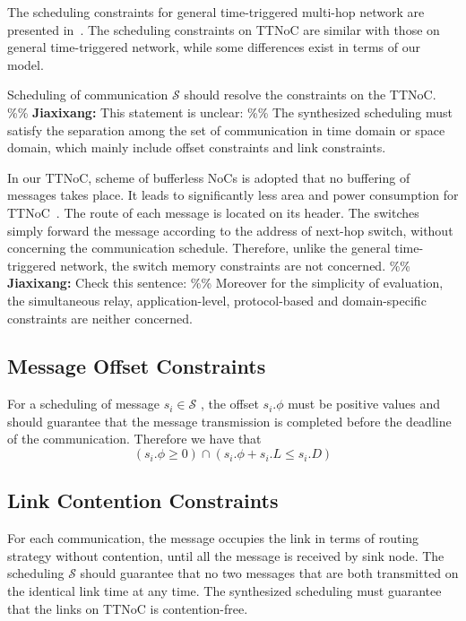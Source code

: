 \documentclass[journal]{IEEEtran}
\newcommand{\calS}{\mathcal{S}}
\newcommand{\jx}[1]{\%\% \textbf{Jiaxixang: }#1 \%\%\xspace}
\begin{document}
The scheduling constraints for general time-triggered multi-hop
network are presented in~\cite{DBLP:conf/rtss/Steiner10}.  The
scheduling constraints on TTNoC are similar with those on general
time-triggered network, while some differences exist in terms of our
model.

Scheduling of communication $\calS$ should resolve the constraints on
the TTNoC. \jx{This statement is unclear:}  The synthesized scheduling must satisfy the separation
among the set of communication in time domain or space domain, which
mainly include offset constraints and link constraints.

In our TTNoC, scheme of bufferless NoCs is adopted that no buffering
of messages takes place.  It leads to significantly less area and
power consumption for TTNoC~\cite{DBLP:journals/tpds/ShpinerKLCK15}.
The route of each message is located on its header.  The switches
simply forward the message according to the address of next-hop
switch, without concerning the communication schedule. Therefore,
unlike the general time-triggered network, the switch memory
constraints are not concerned. \jx{Check this sentence:} Moreover for
the simplicity of evaluation, the simultaneous relay,
application-level, protocol-based and domain-specific constraints are neither
concerned.

\subsection{Message Offset Constraints}

For a scheduling of message $s_{i}\in\calS$ , the offset $s_i.\phi$  must be positive values and should guarantee that the message transmission is completed before the deadline of the communication. Therefore we have that
\begin{equation}
	(s_i.\phi
	\geq 0)
	\cap
	(s_i.\phi + s_i.L
	\leq
	s_i.D)
\end{equation}

\subsection{Link Contention Constraints}

For each communication, the message occupies the link in terms of routing strategy without contention, 
until all the message is received by sink node.
The scheduling $\calS$ should guarantee that no two messages that are both transmitted on the identical link time at any time. 
The synthesized scheduling must guarantee that the links on TTNoC is contention-free.
\end{document}
